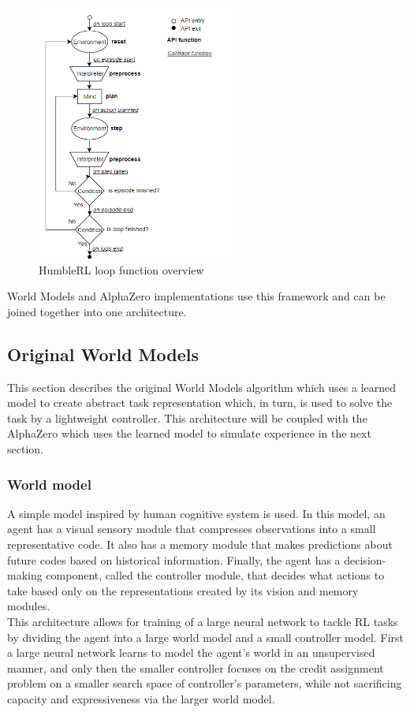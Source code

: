 \begin{figure}[H]
\includegraphics[width=0.6\textwidth,keepaspectratio]{figures/HumbleRL/loop.png}
\caption{HumbleRL loop function overview}
\label{Fig.HRL_loop}
\end{figure}

World Models and AlphaZero implementations use this framework and can be joined together into one architecture.

\subsection{Original World Models}

This section describes the original World Models \cite{Algo.WorldModels} algorithm which uses a learned model to create abstract task representation which, in turn, is used to solve the task by a lightweight controller. This architecture will be coupled with the AlphaZero which uses the learned model to simulate experience in the next section.

\subsubsection{World model}

A simple model inspired by human cognitive system is used. In this model, an agent has a visual sensory module that compresses observations into a small representative code. It also has a memory module that makes predictions about future codes based on historical information. Finally, the agent has a decision-making component, called the controller module, that decides what actions to take based only on the representations created by its vision and memory modules. \\
This architecture allows for training of a large neural network to tackle RL tasks by dividing the agent into a large world model and a small controller model. First a large neural network learns to model the agent’s world in an unsupervised manner, and only then the smaller controller focuses on the credit assignment problem on a smaller search space of controller's parameters, while not sacrificing capacity and expressiveness via the larger world model.


